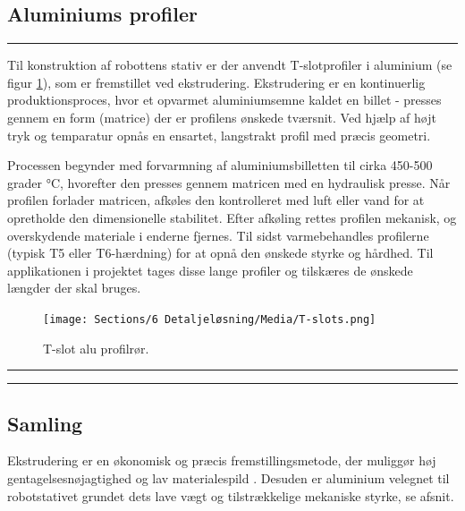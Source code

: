 
\subsection{Aluminiums profiler} \label{alu Ekstrudering} \plainbreak{-.5}
Til konstruktion af robottens stativ er der anvendt T-slotprofiler i aluminium (se figur \ref{fig:T-slot profil}), som er fremstillet ved ekstrudering. Ekstrudering er en kontinuerlig produktionsproces, hvor et opvarmet aluminiumsemne kaldet en billet - presses gennem en form (matrice) der er profilens ønskede tværsnit. Ved hjælp af højt tryk og temparatur opnås en ensartet, langstrakt profil med præcis geometri.\parencite{Johnson1962TheExtrusion} 

Processen begynder med forvarmning af aluminiumsbilletten til cirka 450-500 grader °C, hvorefter den presses gennem matricen med en hydraulisk presse. Når profilen forlader matricen, afkøles den kontrolleret med luft eller vand for at opretholde den dimensionelle stabilitet. Efter afkøling rettes profilen mekanisk, og overskydende materiale i enderne fjernes. Til sidst varmebehandles profilerne (typisk T5 eller T6-hærdning) for at opnå den ønskede styrke og hårdhed. Til applikationen i projektet tages disse lange profiler og tilskæres de ønskede længder der skal bruges. \parencite{Johnson1962TheExtrusion} 
 
\begin{figure}[H]
    \centering
    \texttt{[image: Sections/6 Detaljeløsning/Media/T-slots.png]}
    \caption{T-slot alu profilrør. \parencite{McMaster-Carr2025T-SlottedRails}}
    \label{fig:T-slot profil}
\end{figure} \plainbreak{-.5}


\plainbreak{0.2}
\subsection{Samling} \label{samling}
Ekstrudering er en økonomisk og præcis fremstillingsmetode, der muliggør høj gentagelsesnøjagtighed og lav materialespild \parencite{Johnson1962TheExtrusion}. Desuden er aluminium velegnet til robotstativet grundet dets lave vægt og tilstrækkelige mekaniske styrke, se afsnit. 

